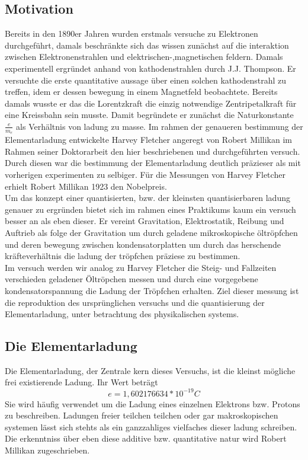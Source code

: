 \documentclass{scrartcl}
\begin{document}
	\subsection{Motivation}
		Bereits in den 1890er Jahren wurden erstmals versuche zu Elektronen durchgeführt, damals
		beschränkte sich das wissen zunächst auf die interaktion zwischen Elektronenstrahlen und elektrischen-,magnetischen feldern.
		Damals experimentell ergründet anhand von kathodenstrahlen durch J.J. Thompson. Er versuchte die erste quantitative aussage über einen
		solchen kathodenstrahl zu treffen, idem er dessen bewegung in einem Magnetfeld beobachtete. Bereits damals
		wusste er das die Lorentzkraft die einzig notwendige Zentripetalkraft für eine Kreissbahn sein musste.
		Damit begründete er zunächst die Naturkonstante $\frac{e}{m_e}$ als Verhältnis von ladung zu masse.
		Im rahmen der genaueren bestimmung der Elementarladung entwickelte Harvey Fletcher angeregt von Robert Millikan im Rahmen
		seiner Doktorarbeit den hier beschriebenen und durchgeführten versuch. Durch diesen war die bestimmung
		der Elementarladung deutlich präzieser als mit vorherigen experimenten zu selbiger.
		Für die Messungen von Harvey Fletcher erhielt Robert Millikan 1923 den Nobelpreis.
		\\
		Um das konzept einer quantisierten, bzw. der kleinsten quantisierbaren ladung genauer
		zu ergründen bietet sich im rahmen eines Praktikums kaum ein versuch besser an als eben dieser.
		Er vereint Gravitation, Elektrostatik, Reibung und Auftrieb als folge der Gravitation um durch
		geladene mikroskopische öltröpfchen und deren bewegung zwischen kondensatorplatten um durch das
		herschende kräfteverhältnis die ladung der tröpfchen präziese zu bestimmen.
		\\
		Im versuch werden wir analog zu Harvey Fletcher die Steig- und Fallzeiten verschieden geladener
		Öltröpchen messen und durch eine vorgegebene kondensatorspannung die Ladung der Tröpfchen erhalten.
		Ziel dieser messung ist die reproduktion des ursprünglichen versuchs und die quantisierung der Elementarladung,
		unter betrachtung des physikalischen systems.
	\subsection{Die Elementarladung}
		Die Elementarladung, der Zentrale kern dieses Versuchs, ist die kleinst mögliche frei existierende Ladung. Ihr Wert beträgt
			\begin{equation}
				e = 1,602 176 634 * 10^{-19} C
			\end{equation}
		Sie wird häufig verwendet um die Ladung eines einzelnen Elektrons bzw. Protons zu beschreiben. Ladungen
		freier teilchen teilchen oder gar makroskopischen systemen lässt sich stehts als ein ganzzahliges vielfaches
		dieser ladung schreiben. Die erkenntniss über eben diese additive bzw. quantitative natur wird Robert Millikan zugeschrieben.
\end{document}
